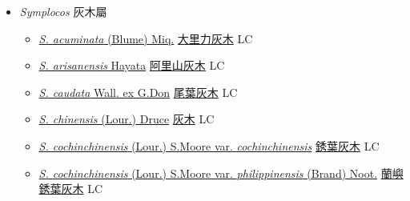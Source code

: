 
  \begin{itemize}
 \item[] \textit{Symplocos} 灰木屬
                    
  \begin{itemize}
        \item[] \href{http://www.theplantlist.org/tpl1.1/search?q=Symplocos+acuminata}{\textit{S. acuminata} (Blume) Miq.}   \href{\detokenize{http://taibnet.sinica.edu.tw/chi/taibnet_species_list.php?T2=大里力灰木&T2_new_value=true&fr=y}}{大里力灰木} LC
        \item[] \href{http://www.theplantlist.org/tpl1.1/search?q=Symplocos+arisanensis}{\textit{S. arisanensis} Hayata}   \href{\detokenize{http://taibnet.sinica.edu.tw/chi/taibnet_species_list.php?T2=阿里山灰木&T2_new_value=true&fr=y}}{阿里山灰木} LC
        \item[] \href{http://www.theplantlist.org/tpl1.1/search?q=Symplocos+caudata}{\textit{S. caudata} Wall. ex G.Don}   \href{\detokenize{http://taibnet.sinica.edu.tw/chi/taibnet_species_list.php?T2=尾葉灰木&T2_new_value=true&fr=y}}{尾葉灰木} LC
        \item[] \href{http://www.theplantlist.org/tpl1.1/search?q=Symplocos+chinensis}{\textit{S. chinensis} (Lour.) Druce}   \href{\detokenize{http://taibnet.sinica.edu.tw/chi/taibnet_species_list.php?T2=灰木&T2_new_value=true&fr=y}}{灰木} LC
        \item[] \href{http://www.theplantlist.org/tpl1.1/search?q=Symplocos+cochinchinensis+var.+cochinchinensis}{\textit{S. cochinchinensis} (Lour.) S.Moore var. \textit{cochinchinensis}}   \href{\detokenize{http://taibnet.sinica.edu.tw/chi/taibnet_species_list.php?T2=銹葉灰木&T2_new_value=true&fr=y}}{銹葉灰木} LC
        \item[] \href{http://www.theplantlist.org/tpl1.1/search?q=Symplocos+cochinchinensis+var.+philippinensis}{\textit{S. cochinchinensis} (Lour.) S.Moore var. \textit{philippinensis} (Brand) Noot.}   \href{\detokenize{http://taibnet.sinica.edu.tw/chi/taibnet_species_list.php?T2=蘭嶼銹葉灰木&T2_new_value=true&fr=y}}{蘭嶼銹葉灰木} LC

\end{itemize}
\end{itemize}
